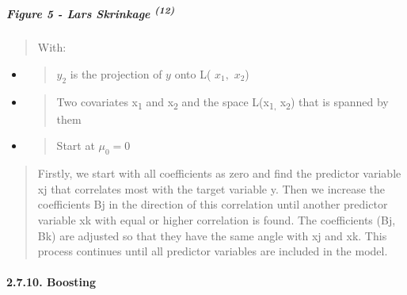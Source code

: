 \documentclass[
]{article}
\begin{document}
\hypertarget{figure-5---lars-skrinkage-12}{%
\subparagraph{\texorpdfstring{\textbf{Figure 5} - Lars Skrinkage
\textsuperscript{(12)}}{Figure 5 - Lars Skrinkage (12)}}\label{figure-5---lars-skrinkage-12}}

\begin{quote}
With:
\end{quote}

\begin{itemize}
\item
  \begin{quote}
  \(y_{2}\) is the projection of \(y\) onto L( \(x_{1},\) \(x_{2}\))
  \end{quote}
\item
  \begin{quote}
  Two covariates x\textsubscript{1} and x\textsubscript{2} and the space
  L(x\textsubscript{1,} x\textsubscript{2}) that is spanned by them
  \end{quote}
\item
  \begin{quote}
  Start at \(\mu_{0} = 0\)
  \end{quote}
\end{itemize}

\begin{quote}
Firstly, we start with all coefficients as zero and find the predictor
variable xj that correlates most with the target variable y. Then we
increase the coefficients Bj in the direction of this correlation until
another predictor variable xk with equal or higher correlation is found.
The coefficients (Bj, Bk) are adjusted so that they have the same angle
with xj and xk. This process continues until all predictor variables are
included in the model.
\end{quote}

\hypertarget{boosting}{%
\paragraph{\texorpdfstring{\textbf{2.7.10.
Boosting}}{2.7.10. Boosting}}\label{boosting}}
\end{document}
